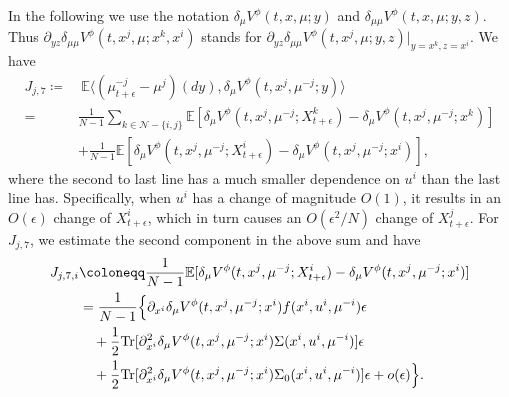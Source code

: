 \documentclass{amsart}
\theoremstyle{definition}
\theoremstyle{remark}
\def\EE{{\mathbb E}}
\def\deltae{\epsilon}
\numberwithin{equation}{section}
\begin{document}
In the following we use the notation $\delta_\mu V^\phi(t, x, \mu;y)$ and $\delta_{\mu\mu} V^\phi(t, x, \mu; y,z)$. Thus $\partial_{yz}\delta_{\mu\mu} V^\phi(t, x^j, \mu; x^k,x^i) $ stands for $ \partial_{yz}\delta_{\mu\mu} V^\phi(t, x^j, \mu; y,z)|_{y=x^k, z=x^i} $.
We have
\begin{align*}
J_{j,7}\coloneqq& \ \EE\langle (\mu_{t+\deltae }^{-j}-\mu^j)(dy), \delta_\mu V^\phi(t, x^j, \mu^{-j}; y) \rangle\\
=&\frac{1}{N-1}\sum_{k \in {\mathcal N} - \{i,j\}  }\EE[\delta_{\mu} V^\phi(t, x^j, \mu^{-j}; X^k_{t+\deltae}) - \delta_{\mu} V^\phi(t, x^j, \mu^{-j}; x^k)] \\
&+ \frac{1}{N-1}\EE[\delta_{\mu} V^\phi(t, x^j, \mu^{-j}; X^i_{t+\deltae})- \delta_\mu V^\phi(t, x^j, \mu^{-j}; x^i)],
\end{align*}
where  the second to last line has a much smaller dependence
on $u^i$ than the last line has.
 Specifically, when $u^i$ has a  change of magnitude $O(1)$, it results in an $O(\deltae)$ change of $X_{t+\deltae}^i$, which in turn causes an $O(\deltae^2/N)$ change of $X_{t+\deltae}^j$.
For $J_{j,7}$, we estimate the second component in the above sum and have
\begin{align*}
J_{j,7,i} &\coloneqq \frac{1}{N-1} \EE[\delta_{\mu} V^\phi(t, x^j, \mu^{-j}; X^i_{t+\deltae})- \delta_{\mu} V^\phi(t, x^j, \mu^{-j}; x^i)] \\
&= \frac{1}{N-1}\Big\{ \partial_{x^i}\delta_{\mu} V^\phi (t, x^j, \mu^{-j}; x^i) f(x^i,  u^i,\mu^{-i}) \deltae  \\
&\quad + \frac{1}{2} {\rm Tr} [\partial^2_{x^i} \delta_{\mu} V^\phi (t, x^j, \mu^{-j}; x^i)\Sigma(x^i,u^i,\mu^{-i}  )]\deltae\\
& \quad +  \frac{1}{2} {\rm Tr} [\partial ^2_{x^i} \delta_{\mu} V^\phi (t, x^j, \mu^{-j}; x^i)\Sigma_0(x^i,u^i,\mu^{-i}  )]\deltae +o(\deltae)\Big\}.%
\end{align*}
\end{document}
